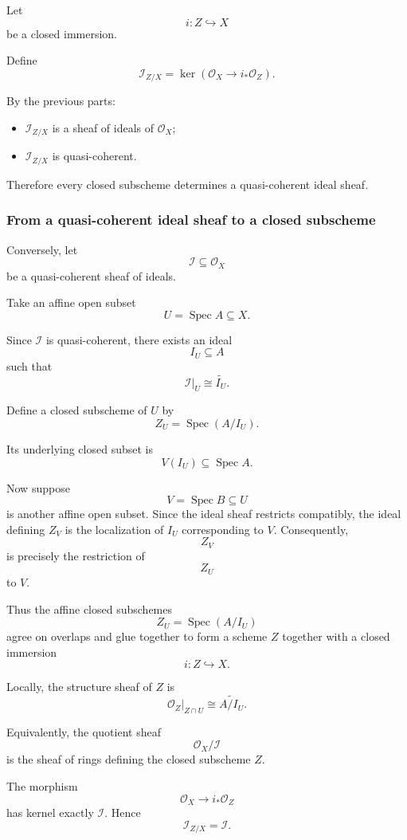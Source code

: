 \documentclass[12pt,a4paper]{article}
\DeclareMathOperator{\Spec}{Spec}
\newcommand{\OO}{\mathcal{O}}
\providecommand{\Spec}{\operatorname{Spec}}
\theoremstyle{notespace}
\begin{document}
Let
\[
i:Z\hookrightarrow X
\]
be a closed immersion.

Define
\[
\mathcal{I}_{Z/X}
=
\ker\!\left(
\OO_X\longrightarrow i_*\OO_Z
\right).
\]

By the previous parts:

\begin{itemize}
	\item \(\mathcal{I}_{Z/X}\) is a sheaf of ideals of \(\OO_X\);
	\item \(\mathcal{I}_{Z/X}\) is quasi-coherent.
\end{itemize}

Therefore every closed subscheme determines a quasi-coherent ideal sheaf.

\subsubsection{From a quasi-coherent ideal sheaf to a closed subscheme}

Conversely, let
\[
\mathcal{I}\subseteq \OO_X
\]
be a quasi-coherent sheaf of ideals.

Take an affine open subset
\[
U=\Spec A\subseteq X.
\]

Since \(\mathcal{I}\) is quasi-coherent, there exists an ideal
\[
I_U\subseteq A
\]
such that
\[
\mathcal{I}|_U\cong \widetilde{I_U}.
\]

Define a closed subscheme of \(U\) by
\[
Z_U=\Spec(A/I_U).
\]

Its underlying closed subset is
\[
V(I_U)\subseteq \Spec A.
\]

Now suppose
\[
V=\Spec B\subseteq U
\]
is another affine open subset. Since the ideal sheaf restricts compatibly, the ideal defining \(Z_V\) is the localization of \(I_U\) corresponding to \(V\). Consequently,
\[
Z_V
\]
is precisely the restriction of
\[
Z_U
\]
to \(V\).

Thus the affine closed subschemes
\[
Z_U=\Spec(A/I_U)
\]
agree on overlaps and glue together to form a scheme \(Z\) together with a closed immersion
\[
i:Z\hookrightarrow X.
\]

Locally, the structure sheaf of \(Z\) is
\[
\OO_Z|_{Z\cap U}
\cong
\widetilde{A/I_U}.
\]

Equivalently, the quotient sheaf
\[
\OO_X/\mathcal{I}
\]
is the sheaf of rings defining the closed subscheme \(Z\).

The morphism
\[
\OO_X\longrightarrow i_*\OO_Z
\]
has kernel exactly \(\mathcal{I}\). Hence
\[
\mathcal{I}_{Z/X}=\mathcal{I}.
\]
\end{document}
